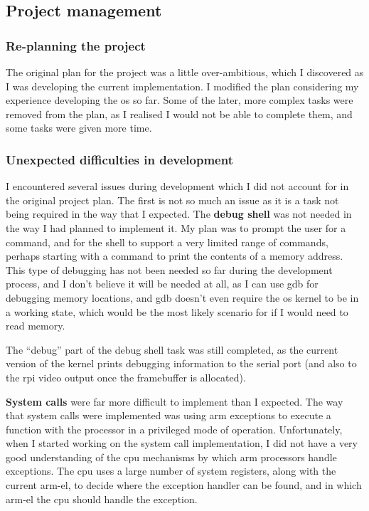 \documentclass{article}
\begin{document}
\subsection{Project management}
\subsubsection{Re-planning the project}
The original plan for the project was a little over-ambitious, which I
discovered as I was developing the current implementation. I modified the
plan considering
my experience developing the \gls{os} so far. Some of the later, more complex
tasks were removed from the plan, as I realised I would not be able
to complete them, and some tasks were given more time.

\subsubsection{Unexpected difficulties in development}
I encountered several issues during development which I did not account
for in the original project plan. The first is not so much an issue as it is a
task not being required in the way that I expected. The \textbf{debug shell}
was not needed in the way I had planned to implement it. My plan was to prompt
the user for a command, and for the shell to support a very limited range of
commands, perhaps starting with a command to print the contents of a memory
address. This type of debugging has not been needed so far during the
development process, and I don't believe it will be needed at all, as I can use
\gls{gdb} for debugging memory locations, and \gls{gdb} doesn't even require
the \gls{os} kernel to be in a working state, which would be the most likely
scenario for if I would need to read memory.

The ``debug'' part of the debug shell task was still completed, as the current
version of the kernel prints debugging information to the serial port (and also
to the \gls{rpi} video output once the framebuffer is allocated).

\textbf{System calls} were far more difficult to implement than I expected. The
way that system calls were implemented was using \gls{arm} exceptions
to execute a function with the processor in a privileged mode of operation.
Unfortunately, when I started working on the system call implementation, I did
not have a very good understanding of the \gls{cpu} mechanisms by which
\gls{arm} processors handle exceptions. The \gls{cpu} uses a large number
of system registers, along with the current \gls{arm-el}, to decide where the
exception handler can be found, and in which \gls{arm-el} the \gls{cpu} should
handle the exception.
\end{document}
